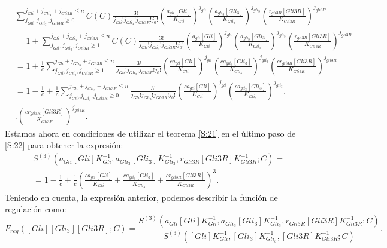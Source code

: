 \begin{equation}
\begin{split}
&\sum_{j_{Gli}, j_{Gli_3}, j_{Gli3R}\geq0}^{j_{Gli}+ j_{Gli_3}+ j_{Gli3R}\leq n}\textit{C}(C)\frac{3!}{j_{Gli}! j_{Gli_3}! j_{Gli3R}!j_0!}
\left(\frac{a_{gli}[Gli]}{K_{Gli}}\right)^{j_{gli}}
\left(\frac{a_{gli_3}[Gli_3]}{K_{Gli_3}}\right)^{j_{gli_3}}
\left(\frac{r_{gli3R}[Gli3R]}{K_{Gli3R}}\right)^{j_{gli3R}}\\&=
1+\sum_{j_{Gli}, j_{Gli_3}, j_{Gli3R}\geq1}^{j_{Gli}+ j_{Gli_3}+ j_{Gli3R}\leq n}\textit{C}(C)\frac{3!}{j_{Gli}! j_{Gli_3}! j_{Gli3R}!j_0!}
\left(\frac{a_{gli}[Gli]}{K_{Gli}}\right)^{j_{gli}}
\left(\frac{a_{gli_3}[Gli_3]}{K_{Gli_3}}\right)^{j_{gli_3}}
\left(\frac{r_{gli3R}[Gli3R]}{K_{Gli3R}}\right)^{j_{gli3R}}\\&=
1+\frac{1}{c}\sum_{j_{Gli}, j_{Gli_3}, j_{Gli3R}\geq1}^{j_{Gli}+ j_{Gli_3}+ j_{Gli3R}\leq n}\frac{3!}{j_{Gli}! j_{Gli_3}! j_{Gli3R}!j_0!}
\left(\frac{ca_{gli}[Gli]}{K_{Gli}}\right)^{j_{gli}}
\left(\frac{ca_{gli_3}[Gli_3]}{K_{Gli_3}}\right)^{j_{gli_3}}
\left(\frac{cr_{gli3R}[Gli3R]}{K_{Gli3R}}\right)^{j_{gli3R}}\\&=
1-\frac{1}{c}+\frac{1}{c}\sum_{j_{Gli}, j_{Gli_3}, j_{Gli3R}\geq0}^{j_{Gli}+ j_{Gli_3}+ j_{Gli3R}\leq n}\frac{3!}{j_{Gli}! j_{Gli_3}! j_{Gli3R}!j_0!}
\left(\frac{ca_{gli}[Gli]}{K_{Gli}}\right)^{j_{gli}}
\left(\frac{ca_{gli_3}[Gli_3]}{K_{Gli_3}}\right)^{j_{gli_3}}.\\&.
\left(\frac{cr_{gli3R}[Gli3R]}{K_{Gli3R}}\right)^{j_{gli3R}}.
\end{split}
\label{S:22}
\end{equation}
Estamos ahora en condiciones de utilizar el teorema \ref{S:21} en el último paso de \ref{S:22} para obtener la expresión:
\begin{equation}
\begin{split}
&S^{(3)}(a_{Gli}[Gli]K_{Gli}^{-1},a_{Gli_3}[Gli_3]K_{Gli_3}^{-1},r_{Gli3R}[Gli3R]K_{Gli3R}^{-1};C)=\\&=
1-\frac{1}{c}+\frac{1}{c}\left(\frac{ca_{gli}[Gli]}{K_{Gli}}+\frac{ca_{gli_3}[Gli_3]}{K_{Gli_3}}+\frac{cr_{gli3R}[Gli3R]}{K_{Gli3R}}\right)^3.
\end{split}
\end{equation}
Teniendo en cuenta, la expresión anterior, podemos describir la función de regulación como: 
\begin{equation}
F_{reg}([Gli][Gli_3][Gli3R];C)=\frac{S^{(3)}(a_{Gli}[Gli]K_{Gli}^{-1},a_{Gli_3}[Gli_3]K_{Gli_3}^{-1},r_{Gli3R}[Gli3R]K_{Gli3R}^{-1};C)}{S^{(3)}([Gli]K_{Gli}^{-1},[Gli_3]K_{Gli_3}^{-1},[Gli3R]K_{Gli3R}^{-1};C)}.
\end{equation}

